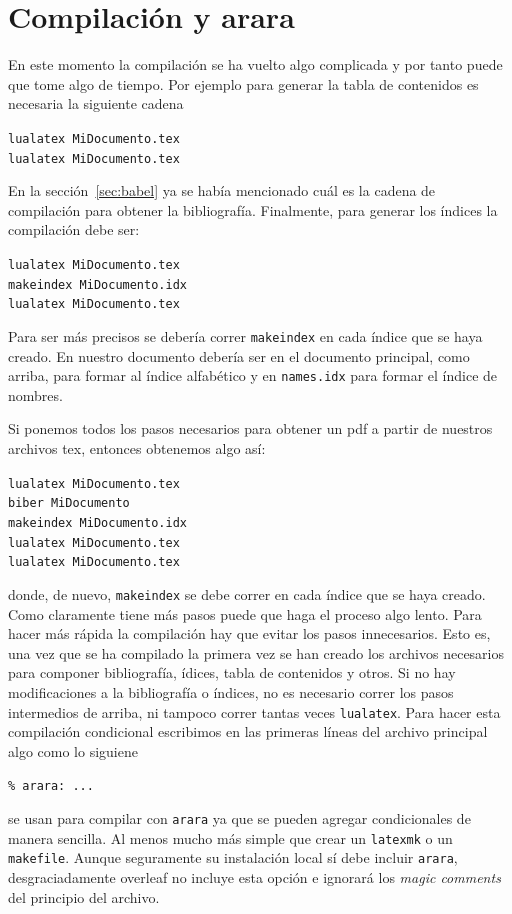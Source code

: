 \chapter{Compilación y arara}
En este momento la compilación se ha vuelto algo complicada y por tanto puede que tome algo de tiempo. Por ejemplo para generar la tabla de contenidos es necesaria la siguiente cadena
\begin{flushleft}
  \verb|lualatex MiDocumento.tex|\\
  \verb|lualatex MiDocumento.tex|
\end{flushleft}

En la sección~\ref{sec:babel} ya se había mencionado cuál es la cadena de
compilación para obtener la bibliografía. Finalmente, para generar los
índices la compilación debe ser:
\begin{flushleft}
  \verb|lualatex MiDocumento.tex|\\
  \verb|makeindex MiDocumento.idx|\\
  \verb|lualatex MiDocumento.tex|
\end{flushleft}

Para ser más precisos se debería correr \texttt{makeindex} en cada índice que
se haya creado. En nuestro documento debería ser en el documento principal,
como arriba, para formar al índice alfabético y en \texttt{names.idx} para
formar el índice de nombres.

Si ponemos todos los pasos necesarios para obtener un pdf a partir de nuestros archivos tex, entonces obtenemos algo así:
\begin{flushleft}
  \verb|lualatex MiDocumento.tex|\\
  \verb|biber MiDocumento|\\
  \verb|makeindex MiDocumento.idx|\\
  \verb|lualatex MiDocumento.tex|\\
  \verb|lualatex MiDocumento.tex|
\end{flushleft}
donde, de nuevo, \texttt{makeindex} se debe correr en cada índice que se haya
creado. Como claramente tiene más pasos puede que haga el proceso algo lento.
Para hacer más rápida la compilación hay que evitar los pasos innecesarios.
Esto es, una vez que se ha compilado la primera vez se han creado los
archivos necesarios para componer bibliografía, ídices, tabla de contenidos y
otros. Si no hay modificaciones a la bibliografía o índices, no es necesario
correr los pasos intermedios de arriba, ni tampoco correr tantas veces
\texttt{lualatex}. Para hacer esta compilación condicional escribimos
en las primeras líneas del archivo principal algo como lo siguiene
\begin{flushleft}
  \verb|% arara: ...|
\end{flushleft}
se usan para compilar con \texttt{arara} ya que se pueden agregar
condicionales de manera sencilla. Al menos mucho más simple que crear un
\texttt{latexmk} o un \texttt{makefile}. Aunque seguramente su instalación
local sí debe incluir \texttt{arara}, desgraciadamente overleaf no incluye
esta opción e ignorará los \textit{magic comments} del principio del archivo.

